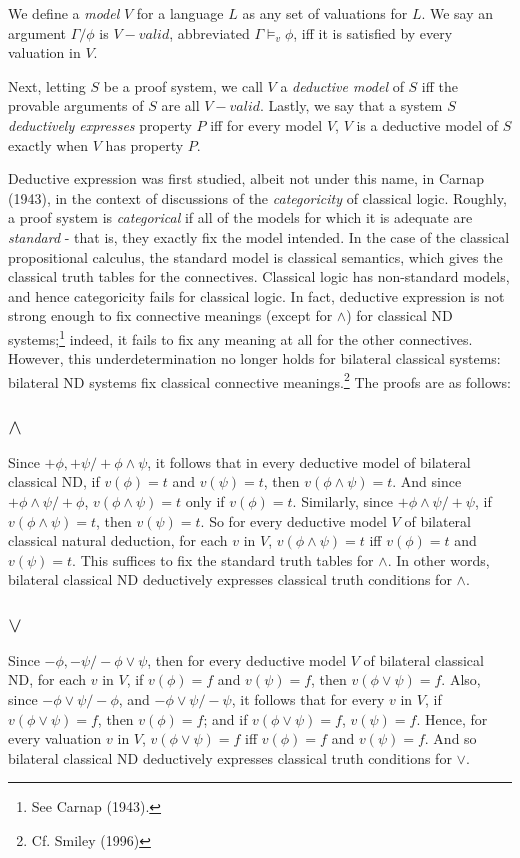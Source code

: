 \documentclass[]{article}
\begin{document}
We define a \textit{model} $V$ for a language $L$ as any set of valuations for $L$. We say an argument $\Gamma / \phi$ is $V-valid$, abbreviated $\Gamma \models_{v} \phi$, iff it is satisfied by every valuation in $V$.

Next, letting $S$ be a proof system, we call $V$ a \textit{deductive model} of $S$ iff the provable arguments of $S$ are all $V-valid$. Lastly, we say that a system $S$ \textit{deductively expresses} property $P$ iff for every model $V$, $V$ is a deductive model of $S$ exactly when $V$ has property $P$.

Deductive expression was first studied, albeit not under this name, in Carnap (1943), in the context of discussions of the \textit{categoricity} of classical logic. Roughly, a proof system is \textit{categorical} if all of the models for which it is adequate are \textit{standard} - that is, they exactly fix the model intended. In the case of the classical propositional calculus, the standard model is classical semantics, which gives the classical truth tables for the connectives. Classical logic has non-standard models, and hence categoricity fails for classical logic. In fact, deductive expression is not strong enough to fix connective meanings (except for $\wedge$) for classical ND systems;\footnote{See Carnap (1943).} indeed, it fails to fix any meaning at all for the other connectives. However, this underdetermination no longer holds for bilateral classical systems: bilateral ND systems fix classical connective meanings.\footnote{Cf. Smiley (1996)} The proofs are as follows:
\subsection{$\wedge$}
Since $+\phi, +\psi / +\phi\wedge\psi$, it follows that in every deductive model of bilateral classical ND, if $v(\phi) = t$ and $v(\psi) = t$, then  $v(\phi\wedge\psi) = t$. And since $+\phi\wedge\psi / +\phi$, $v(\phi\wedge\psi) = t$ only if $v(\phi) = t$. Similarly, since $+\phi\wedge\psi / +\psi$, if $v(\phi\wedge\psi) = t$, then $v(\psi) = t$. So for every deductive model $V$ of bilateral classical natural deduction, for each $v$ in $V$, $v(\phi\wedge\psi) = t$ iff $v(\phi) = t$ and $v(\psi) = t$. This suffices to fix the standard truth tables for $\wedge$. In other words, bilateral classical ND deductively expresses classical truth conditions for $\wedge$.
\subsection{$\vee$}
Since $-\phi, -\psi / -\phi\vee\psi$, then for every deductive model $V$ of bilateral classical ND, for each $v$ in $V$, if $v(\phi) = f$ and $v(\psi) = f$, then $v(\phi\vee\psi) = f$. Also, since $-\phi\vee\psi / -\phi$, and $-\phi\vee\psi / -\psi$, it follows that for every $v$ in $V$, if $v(\phi\vee\psi) = f$, then $v(\phi) = f$; and if $v(\phi\vee\psi) = f$, $v(\psi) = f$. Hence, for every valuation $v$ in $V$, $v(\phi\vee\psi) = f$ iff $v(\phi) = f$ and $v(\psi) = f$. And so bilateral classical ND deductively expresses classical truth conditions for $\vee$.
\end{document}
